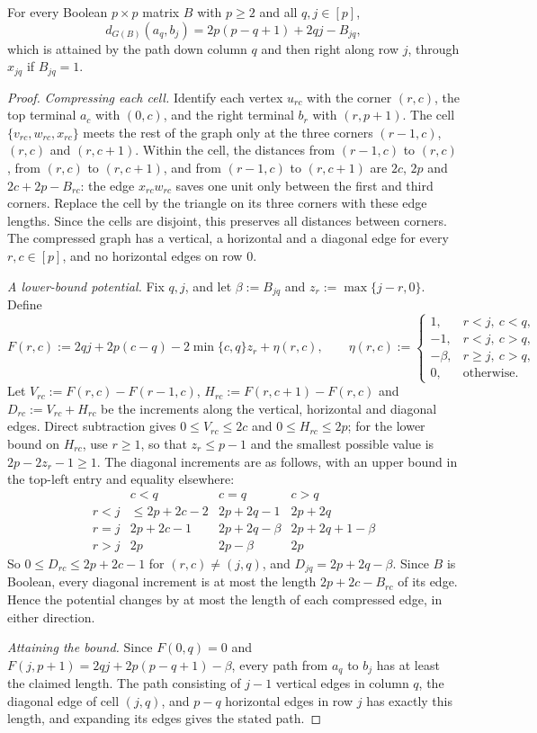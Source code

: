 \begin{lemma}\label{lem:planar-grid-distance}
For every Boolean $p\times p$ matrix $B$ with $p\ge2$ and all $q,j\in[p]$,
\[
 d_{G(B)}(a_q,b_j)=2p(p-q+1)+2qj-B_{jq},
\]
which is attained by the path down column $q$ and then right along row $j$, through $x_{jq}$ if $B_{jq}=1$.
\end{lemma}
\begin{proof}
\emph{Compressing each cell.} Identify each vertex $u_{rc}$ with the corner $(r,c)$, the top terminal $a_c$ with $(0,c)$, and the right terminal $b_r$ with $(r,p+1)$. The cell $\{v_{rc},w_{rc},x_{rc}\}$ meets the rest of the graph only at the three corners $(r-1,c)$, $(r,c)$ and $(r,c+1)$. Within the cell, the distances from $(r-1,c)$ to $(r,c)$, from $(r,c)$ to $(r,c+1)$, and from $(r-1,c)$ to $(r,c+1)$ are $2c$, $2p$ and $2c+2p-B_{rc}$: the edge $x_{rc}w_{rc}$ saves one unit only between the first and third corners. Replace the cell by the triangle on its three corners with these edge lengths. Since the cells are disjoint, this preserves all distances between corners. The compressed graph has a vertical, a horizontal and a diagonal edge for every $r,c\in[p]$, and no horizontal edges on row $0$.

\smallskip\noindent\emph{A lower-bound potential.} Fix $q,j$, and let $\beta:=B_{jq}$ and $z_r:=\max\{j-r,0\}$. Define
\[
 F(r,c):=2qj+2p(c-q)-2\min\{c,q\}z_r+\eta(r,c),
 \qquad
 \eta(r,c):=
 \begin{cases}
  1,&r<j,\ c<q,\\
  -1,&r<j,\ c>q,\\
  -\beta,&r\ge j,\ c>q,\\
  0,&\text{otherwise}.
 \end{cases}
\]
Let $V_{rc}:=F(r,c)-F(r-1,c)$, $H_{rc}:=F(r,c+1)-F(r,c)$ and $D_{rc}:=V_{rc}+H_{rc}$ be the increments along the vertical, horizontal and diagonal edges. Direct subtraction gives $0\le V_{rc}\le2c$ and $0\le H_{rc}\le2p$; for the lower bound on $H_{rc}$, use $r\ge1$, so that $z_r\le p-1$ and the smallest possible value is $2p-2z_r-1\ge1$. The diagonal increments are as follows, with an upper bound in the top-left entry and equality elsewhere:
\[
\begin{array}{c|ccc}
 &c<q&c=q&c>q\\\hline
 r<j&\le2p+2c-2&2p+2q-1&2p+2q\\
 r=j&2p+2c-1&2p+2q-\beta&2p+2q+1-\beta\\
 r>j&2p&2p-\beta&2p
\end{array}
\]
So $0\le D_{rc}\le2p+2c-1$ for $(r,c)\ne(j,q)$, and $D_{jq}=2p+2q-\beta$. Since $B$ is Boolean, every diagonal increment is at most the length $2p+2c-B_{rc}$ of its edge. Hence the potential changes by at most the length of each compressed edge, in either direction.

\smallskip\noindent\emph{Attaining the bound.} Since $F(0,q)=0$ and $F(j,p+1)=2qj+2p(p-q+1)-\beta$, every path from $a_q$ to $b_j$ has at least the claimed length. The path consisting of $j-1$ vertical edges in column $q$, the diagonal edge of cell $(j,q)$, and $p-q$ horizontal edges in row $j$ has exactly this length, and expanding its edges gives the stated path.
\end{proof}

